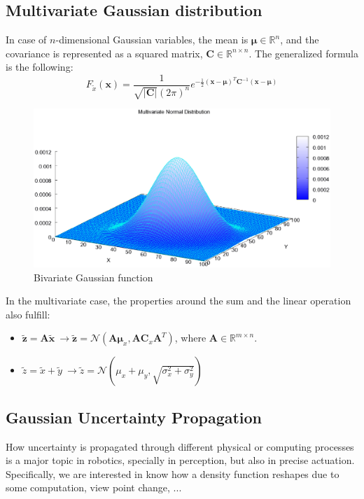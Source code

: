 \subsection{Multivariate Gaussian distribution}
\label{subsec:mulivariate_gaussian_distribution}
In case of $n$-dimensional Gaussian variables, the mean is $\boldsymbol{\mu} \in \mathbb{R}^n$, and the covariance is represented as a squared matrix, $\mathbf{C}\in\mathbb{R}^{n\times n}$. The generalized formula is the following: 
\begin{equation}
 F_{\tilde{x}}(\mathbf{x}) = \frac{1}{\sqrt{\vert \mathbf{C}\vert}(2\pi)^n}
			    e^{-\frac{1}{2}(\mathbf{x}-\boldsymbol\mu)^T\mathbf{C}^{-1}(\mathbf{x}-\boldsymbol\mu)}
\end{equation}
\begin{figure}[bth!]
  \begin{center}
    \includegraphics[width=1.0\columnwidth]{figures/mv_gaussian.eps}
    \caption{Bivariate Gaussian function}
    \label{fig:mv_gaussian}
  \end{center}
\end{figure}

In the multivariate case, the properties around the sum and the linear operation also fulfill: 
\begin{itemize}
 \item $\tilde{\mathbf{z}}=\mathbf{A}\tilde{\mathbf{x}} \ 
      \rightarrow \tilde{\mathbf{z}}=\mathcal{N}(\mathbf{A}\boldsymbol\mu_x,\mathbf{A}\mathbf{C}_x\mathbf{A}^T)$, 
      where $\mathbf{A}\in \mathbb{R}^{m \times n}$.
 \item $\tilde{z}=\tilde{x}+\tilde{y} \ 
      \rightarrow \tilde{z}=\mathcal{N}(\mu_x+\mu_y,\sqrt{\sigma^2_x+\sigma^2_y})$
\end{itemize}


\subsection{Gaussian Uncertainty Propagation}
How uncertainty is propagated through different physical or computing processes is a major topic in robotics, specially in perception, but also in precise actuation. Specifically, we are interested in know how a density function reshapes due to some computation, view point change, ...

